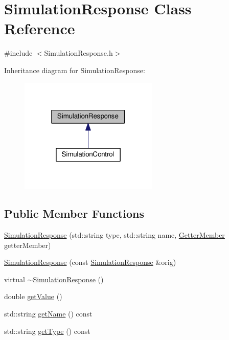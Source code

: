 \hypertarget{class_simulation_response}{}\section{Simulation\+Response Class Reference}
\label{class_simulation_response}


{\ttfamily \#include $<$Simulation\+Response.\+h$>$}



Inheritance diagram for Simulation\+Response\+:\nopagebreak
\begin{figure}[H]
\begin{center}
\leavevmode
\includegraphics[width=187pt]{class_simulation_response__inherit__graph}
\end{center}
\end{figure}
\subsection*{Public Member Functions}
\begin{DoxyCompactItemize}
\item 
\hyperlink{class_simulation_response_aae903c47cd9526b074785339f5b50cba}{Simulation\+Response} (std\+::string type, std\+::string name, \hyperlink{_define_getter_setter_8h_ab6b06e94d7f95d16eff9bba4045d7f6c}{Getter\+Member} getter\+Member)
\item 
\hyperlink{class_simulation_response_aaa3a1bdb3a9a330eea2264fdeaa2bdb2}{Simulation\+Response} (const \hyperlink{class_simulation_response}{Simulation\+Response} \&orig)
\item 
virtual \hyperlink{class_simulation_response_acca988782297cd916b8a8532368fc94d}{$\sim$\+Simulation\+Response} ()
\item 
double \hyperlink{class_simulation_response_a192c1e10f0ecd3e6f6a06990bc73c07a}{get\+Value} ()
\item 
std\+::string \hyperlink{class_simulation_response_a2f1db747e9dfd4d641d761b6cf23af9b}{get\+Name} () const 
\item 
std\+::string \hyperlink{class_simulation_response_a3fd37c35a74ec17b651eea2e145ecf4f}{get\+Type} () const 
\end{DoxyCompactItemize}
